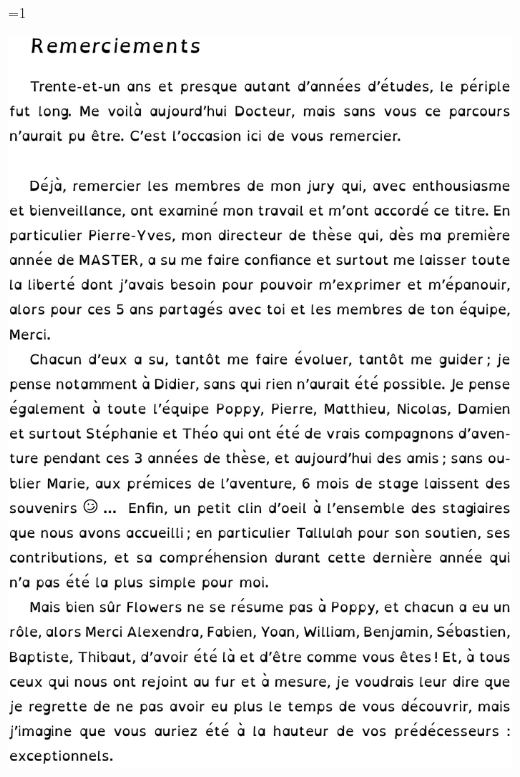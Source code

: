 \setcounter{ct}{1}
%
{%
  \ifnum \value{ct}=1
  \fi
  \begin{center}
  \includegraphics[width=0.9\linewidth,page=\thect]{Texte/Partie0/Preface/Remerciement.pdf}
  \end{center}
}

